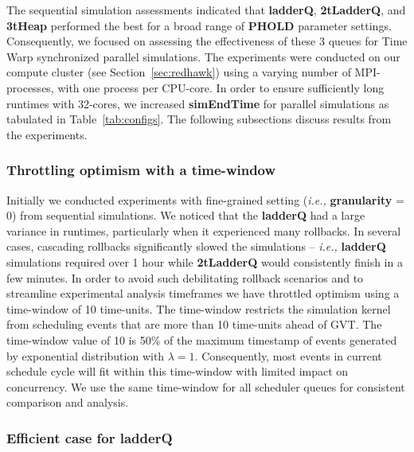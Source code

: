 The sequential simulation assessments indicated that \textbf{ladderQ}, \textbf{2tLadderQ}, and \textbf{3tHeap} performed the best for a broad range of \textbf{PHOLD} parameter settings. Consequently, we focused on assessing the effectiveness of these 3 queues for Time Warp synchronized parallel simulations. The experiments were conducted on our compute cluster (see Section~\ref{sec:redhawk}) using a varying number of MPI-processes, with one process per CPU-core. In order to ensure sufficiently long runtimes with 32-cores, we increased \textbf{simEndTime} for parallel simulations as tabulated in Table~\ref{tab:configs}. The following subsections discuss results from the experiments.

\subsubsection{Throttling optimism with a time-window}

Initially we conducted experiments with fine-grained setting (\textit{i.e.,} \textbf{granularity} = 0) from sequential simulations. We noticed that the \textbf{ladderQ} had a large variance in runtimes, particularly when it experienced many rollbacks. In several cases, cascading rollbacks significantly slowed the simulations -- \textit{i.e.,} \textbf{ladderQ} simulations required over 1 hour while \textbf{2tLadderQ} would consistently finish in a few minutes. In order to avoid such debilitating rollback scenarios and to streamline experimental analysis timeframes we have throttled optimism using a time-window of 10 time-units. The time-window restricts the simulation kernel from scheduling events that are more than 10 time-units ahead of GVT. The time-window value of 10 is 50\% of the maximum timestamp of events generated by exponential distribution with $\lambda=1$. Consequently, most events in current schedule cycle will fit within this time-window with limited impact on concurrency. We use the same time-window for all scheduler queues for consistent comparison and analysis.

\subsubsection{Efficient case for \textbf{ladderQ}}

